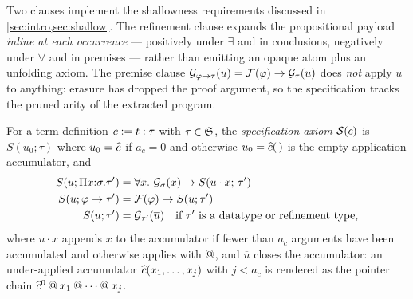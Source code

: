 Two clauses implement the shallowness requirements discussed in
\cref{sec:intro,sec:shallow}.  The refinement clause expands the
propositional payload \emph{inline at each occurrence} --- positively
under $\exists$ and in conclusions, negatively under $\forall$ and in
premises --- rather than emitting an opaque atom plus an unfolding axiom.
The premise clause $\mathcal{G}_{\varphi \to \tau}(u) = \mathcal{F}(\varphi) \to
\mathcal{G}_{\tau}(u)$ does \emph{not} apply $u$ to anything: erasure has
dropped the proof argument, so the specification tracks the pruned arity
of the extracted program.

\begin{definition}
\label{def:spec}
For a term definition $c \mathrel{:=} t : \tau$ with $\tau \in \mathfrak{S}$, the
\emph{specification axiom} $\mathcal{S}(c)$ is $S(u_0; \tau)$ where $u_0 =
\widehat{c}$ if $a_c = 0$ and otherwise $u_0 = \widehat{c}(\,)$ is the empty
application accumulator, and
\begin{align*}
  S(u; \Pi x{:}\sigma.\tau') &= \forall x.\ \mathcal{G}_{\sigma}(x) \to
    S(u \cdot x;\, \tau')\\
  S(u; \varphi \to \tau') &= \mathcal{F}(\varphi) \to S(u; \tau')\\
  S(u; \tau') &= \mathcal{G}_{\tau'}(\overline{u}) \quad
    \text{if $\tau'$ is a datatype or refinement type,}
\end{align*}
where $u \cdot x$ appends $x$ to the accumulator if fewer than $a_c$
arguments have been accumulated and otherwise applies with $\mathbin{@}$, and
$\overline{u}$ closes the accumulator: an under-applied accumulator
$\widehat{c}(x_1, \dots, x_j)$ with $j < a_c$ is rendered as the pointer
chain $\widehat{c}^0 \mathbin{@} x_1 \mathbin{@} \cdots \mathbin{@} x_j$.
\end{definition}

